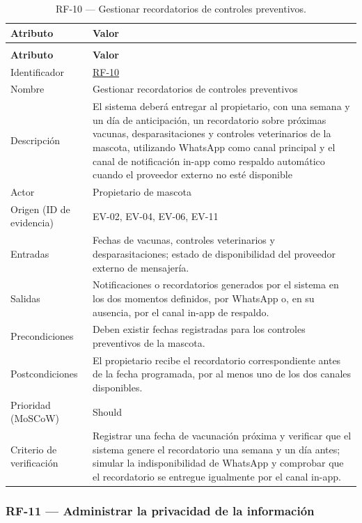 \documentclass[journal,onecolumn]{IEEEtran}
\makeatletter
\newenvironment{atributos}[2]{%
	\small
	\begin{longtable}{@{}>{\raggedright\arraybackslash}p{4.2cm} >{\raggedright\arraybackslash}p{11.2cm}@{}}
		\caption{#2}\label{tab:#1}\\
		\toprule
		\textbf{Atributo} & \textbf{Valor} \\
		\midrule
		\endfirsthead
		\multicolumn{2}{@{}l}{\small\itshape (continuación)}\\
		\toprule
		\textbf{Atributo} & \textbf{Valor} \\
		\midrule
		\endhead
		\bottomrule
		\endlastfoot
	}{%
	\end{longtable}
	\normalsize
}
\makeatother
\begin{document}
	\begin{atributos}{RF-10}{RF-10 --- Gestionar recordatorios de controles preventivos.}
		Identificador & \hyperref[tab:RF-10]{RF-10} \\
		Nombre & Gestionar recordatorios de controles preventivos \\
		Descripción & El sistema deberá entregar al propietario, con una semana y un día de anticipación, un recordatorio sobre próximas vacunas, desparasitaciones y controles veterinarios de la mascota, utilizando WhatsApp como canal principal y el canal de notificación in-app como respaldo automático cuando el proveedor externo no esté disponible \\
		Actor & Propietario de mascota \\
		Origen (ID de evidencia) & EV-02, EV-04, EV-06, EV-11 \\
		Entradas & Fechas de vacunas, controles veterinarios y desparasitaciones; estado de disponibilidad del proveedor externo de mensajería. \\
		Salidas & Notificaciones o recordatorios generados por el sistema en los dos momentos definidos, por WhatsApp o, en su ausencia, por el canal in-app de respaldo. \\
		Precondiciones & Deben existir fechas registradas para los controles preventivos de la mascota. \\
		Postcondiciones & El propietario recibe el recordatorio correspondiente antes de la fecha programada, por al menos uno de los dos canales disponibles. \\
		Prioridad (MoSCoW) & Should \\
		Criterio de verificación & Registrar una fecha de vacunación próxima y verificar que el sistema genere el recordatorio una semana y un día antes; simular la indisponibilidad de WhatsApp y comprobar que el recordatorio se entregue igualmente por el canal in-app. \\
	\end{atributos}
	
	
	\subsubsection{RF-11 --- Administrar la privacidad de la información}
	
\end{document}
